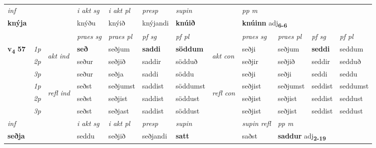 \begin{longtable}[l]{X>{\footnotesize\itshape}llXXXXlXXXX}
   {\textit{inf}} & &  & \textit{i akt sg} & \textit{i akt pl}   & \textit{presp} & \textit{supin}  && \textit{pp m} \\*
  {\textbf{knýja}} & && knýðu  & knýið   & knýjandi &  \textbf{knúið}  && \multicolumn{2}{l}{\textbf{knúinn} adj\textbf{\textsubscript{6-6}}} \\*

\midrule

 & &   & \textit{praes sg}  & \textit{praes pl}    & \textit{ pf sg} & \textit{pf pl} & & \textit{praes sg}  & \textit{praes pl}    & \textit{pf sg} & \textit{pf pl }  \\ \cmidrule{4-7} \cmidrule{9-12}
 \multirow{2}{*}{{{\textbf{v{\textsubscript{4}}} \Large{\textbf{57}}}}}  & 1p & \multirow{3}{*}{\begin{turn}{90}\textit{akt ind}\end{turn}} & \textbf{seð} & seðjum & \textbf{saddi} & \textbf{söddum} & \multirow{3}{*}{\begin{turn}{90}\textit{akt con}\end{turn}} &seðji & seðjum & \textbf{seddi} & seddum\\*
 & 2p &  &  seður  & seðjið & saddir & södduð & & seðjir & seðjið & seddir & sedduð \\*
 & 3p &  & seður & seðja & saddi & söddu & & seðji & seðji& seddi & seddu \\*
\cmidrule{4-7} \cmidrule{9-12}
 & 1p & \multirow{3}{*}{\begin{turn}{90}\textit{refl ind}\end{turn}}  & seðst & seðjumst & saddist & söddumst & \multirow{3}{*}{\begin{turn}{90}\textit{refl con}\end{turn}}  &seðjist & seðjumst & seddist & seddumst \\*
 & 2p &  & seðst & seðjist & saddist & söddust & &seðjist & seðjist & seddist & seddust \\*
 & 3p  & & seðst & seðjast & saddist & söddust & & seðjist & seðjist& seddist & seddust \\*
\cmidrule{4-7} \cmidrule{9-12}

   {\textit{inf}} & &  & \textit{i akt sg} & \textit{i akt pl}   & \textit{presp} & \textit{supin} && \textit{supin refl} & \textit{pp m} \\*
  {\textbf{seðja}} & && seddu  & seðjið   & seðjandi &  \textbf{satt} && saðst & \multicolumn{2}{l}{\textbf{saddur} adj\textbf{\textsubscript{2-19}}} \\*


\end{longtable}
